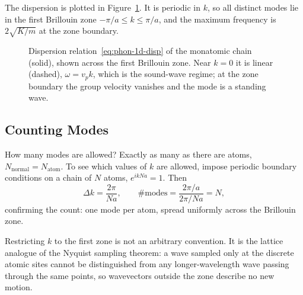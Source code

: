 The dispersion is plotted in Figure~\ref{fig:phon-1d-disp}. It is periodic in $k$, so all distinct modes lie in the first Brillouin zone $-\pi/a \le k \le \pi/a$, and the maximum frequency is $2\sqrt{K/m}$ at the zone boundary.

\begin{figure}[ht]
\centering
{}
\caption{Dispersion relation~\eqref{eq:phon-1d-disp} of the monatomic chain (solid), shown across the first Brillouin zone. Near $k=0$ it is linear (dashed), $\omega = v_p k$, which is the sound-wave regime; at the zone boundary the group velocity vanishes and the mode is a standing wave.}
\label{fig:phon-1d-disp}
\end{figure}

\subsection{Counting Modes}

How many modes are allowed? Exactly as many as there are atoms, $N_{\text{normal}} = N_{\text{atom}}$. To see which values of $k$ are allowed, impose periodic boundary conditions on a chain of $N$ atoms, $e^{ikNa} = 1$. Then
\begin{equation}
    \Delta k = \frac{2\pi}{Na}, \qquad \#\text{modes} = \frac{2\pi/a}{2\pi/Na} = N,
\end{equation}
confirming the count: one mode per atom, spread uniformly across the Brillouin zone.

Restricting $k$ to the first zone is not an arbitrary convention. It is the lattice analogue of the Nyquist sampling theorem: a wave sampled only at the discrete atomic sites cannot be distinguished from any longer-wavelength wave passing through the same points, so wavevectors outside the zone describe no new motion.


